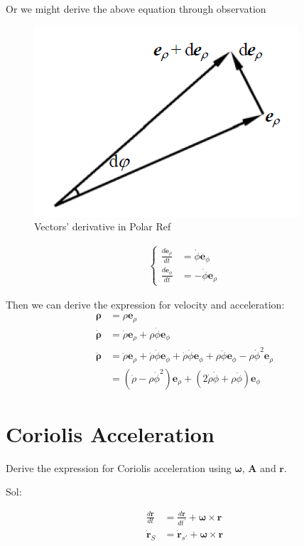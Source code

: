 \documentclass[11pt, a4paper, oneside]{book}
\numberwithin{equation}{section}%
\begin{document}
Or we might derive the above equation through observation
\begin{figure}[H]
	\centering
	\includegraphics[width=0.3\linewidth]{"Vector in Polar Ref"}
	\caption{Vectors' derivative in Polar Ref}
	\label{Vector in Polar Ref}
\end{figure}

\begin{align}
	\left\{\begin{aligned}
	\frac{d\bm{e}_\rho}{dt} &= \dot{\phi}\bm{e}_\phi\\
	\frac{d\bm{e}_\phi}{dt} &= -\dot{\phi}\bm{e}_\rho
	\end{aligned}\right.
\end{align}

Then we can derive the expression for velocity and acceleration:
\begin{align}
	\bm{\rho} &= \rho \bm{e}_\rho\\
	\dot{\bm{\rho}} &= \dot{\rho} \bm{e}_\rho + \rho \dot{\phi} \bm{e}_\phi\\
	\ddot{\bm{\rho}} &= \ddot{\rho}\bm{e}_\rho + \dot{\rho}\dot{\phi}\bm{e}_\phi + \dot{\rho}\dot{\phi}\bm{e}_\phi + \rho\ddot{\phi}\bm{e}_\phi - \rho\dot{\phi}^2\bm{e}_\rho\\
	&= (\ddot{\rho} - \rho\dot{\phi}^2 )\bm{e}_\rho + (2\dot{\rho}\dot{\phi} + \rho\ddot{\phi})\bm{e}_\phi
\end{align}








\section{Coriolis Acceleration}
Derive the expression for Coriolis acceleration using $\bm{\omega}$, $\bm{A}$ and $\bm{r}$.

Sol:

\begin{align}
	\frac{d\bm{r}}{dt}&=\frac{d\bm{r}}{dt^{'}}+\bm{\omega}\times \bm{r}\\
	\dot{\bm{r}}_S&=\dot{\bm{r}}_{s'}+\bm{\omega}\times \bm{r}
\end{align}
	
\end{document}
